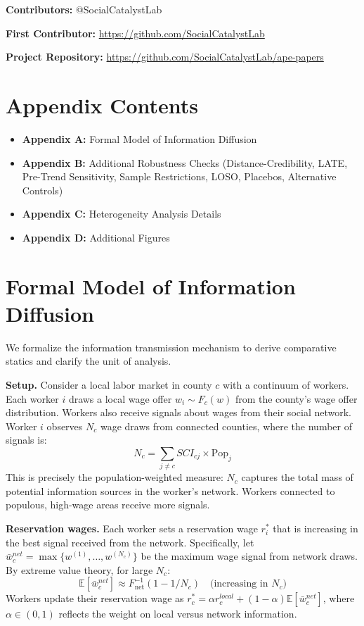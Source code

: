 \documentclass[12pt]{article}
\newcommand{\E}{\mathbb{E}}
\begin{document}
\noindent\textbf{Contributors:} @SocialCatalystLab

\noindent\textbf{First Contributor:} \url{https://github.com/SocialCatalystLab}

\noindent\textbf{Project Repository:} \url{https://github.com/SocialCatalystLab/ape-papers}


\clearpage
\appendix

\section*{Appendix Contents}
\begin{itemize}
\item \textbf{Appendix A:} Formal Model of Information Diffusion
\item \textbf{Appendix B:} Additional Robustness Checks (Distance-Credibility, LATE, Pre-Trend Sensitivity, Sample Restrictions, LOSO, Placebos, Alternative Controls)
\item \textbf{Appendix C:} Heterogeneity Analysis Details
\item \textbf{Appendix D:} Additional Figures
\end{itemize}

\section{Formal Model of Information Diffusion}
\label{sec:formal_model_appendix}

We formalize the information transmission mechanism to derive comparative statics and clarify the unit of analysis.

\textbf{Setup.} Consider a local labor market in county $c$ with a continuum of workers. Each worker $i$ draws a local wage offer $w_i \sim F_c(w)$ from the county's wage offer distribution. Workers also receive signals about wages from their social network. Worker $i$ observes $N_c$ wage draws from connected counties, where the number of signals is:
\begin{equation}
N_c = \sum_{j \neq c} SCI_{cj} \times \text{Pop}_j
\end{equation}
This is precisely the population-weighted measure: $N_c$ captures the total mass of potential information sources in the worker's network. Workers connected to populous, high-wage areas receive more signals.

\textbf{Reservation wages.} Each worker sets a reservation wage $r^*_i$ that is increasing in the best signal received from the network. Specifically, let $\bar{w}^{net}_c = \max\{w^{(1)}, \ldots, w^{(N_c)}\}$ be the maximum wage signal from network draws. By extreme value theory, for large $N_c$:
\begin{equation}
\E[\bar{w}^{net}_c] \approx F^{-1}_{\text{net}}(1 - 1/N_c) \quad \text{(increasing in } N_c\text{)}
\end{equation}
Workers update their reservation wage as $r^*_c = \alpha r^{local}_c + (1-\alpha) \E[\bar{w}^{net}_c]$, where $\alpha \in (0,1)$ reflects the weight on local versus network information.
\end{document}
